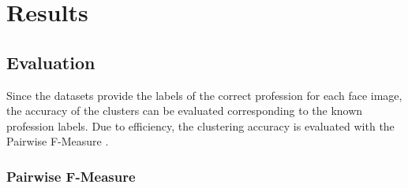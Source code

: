 \documentclass[12pt,english]{article}
\begin{document}
\section{Results}

\subsection{Evaluation}
\quad
Since the datasets provide the labels of the correct profession for each face image, the accuracy of the clusters can be evaluated corresponding to the known profession labels. Due to efficiency, the clustering accuracy is evaluated with the Pairwise F-Measure \cite{otto}.
\newpage
\subsubsection{Pairwise F-Measure}
\end{document}
